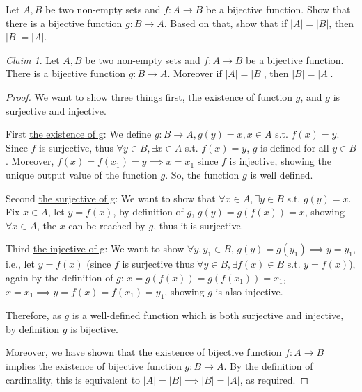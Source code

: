 \documentclass{homework}
\newcommand{\ra}{\rightarrow}
\newcommand{\?}{\stackrel{?}{=}}
\theoremstyle{remark}
\newtheorem*{claim}{Claim}
\begin{document}
\question Let $A,B$ be two non-empty sets and $f:A\rightarrow B$ be a bijective function. Show that there is a bijective function $g:B\rightarrow A$. Based on that, show that if $|A|=|B|$, then $|B|=|A|$. 
\begin{claim}
    Let $A,B$ be two non-empty sets and $f:A\rightarrow B$ be a bijective function. There is a bijective function $g:B\rightarrow A$. Moreover if $|A|=|B|$, then $|B|=|A|$. 
\end{claim}
\begin{proof}
    We want to show three things first, the existence of function $g$, and $g$ is surjective and injective.

    First \underline{the existence of g}: We define $g: B\ra A, g(y)=x, x\in A $ s.t. $f(x)=y$. Since $f$ is surjective, thus $\forall y\in B, \exists x\in A$ s.t. $f(x)=y$, $g$ is defined for all $y\in B$. Moreover, $f(x)=f(x_1)=y\implies x=x_1$ since $f$ is injective, showing the unique output value of the function $g$. So, the function $g$ is well defined.

    Second \underline{the surjective of g}: We want to show that $\forall x\in A, \exists y\in B$ s.t. $g(y)=x$. Fix $x\in A$, let $y=f(x)$, by definition of $g$, $g(y)=g(f(x))=x$, showing $\forall x\in A$, the $x$ can be reached by $g$, thus it is surjective.

    Third \underline{the injective of g}: We want to show $\forall y,y_1\in B$, $g(y)=g(y_1)\implies y=y_1$, i.e., let $y=f(x)$ (since $f$ is surjective thus $\forall y\in B, \exists f(x)\in B$ s.t. $y=f(x)$), again by the definition of $g$: $x=g(f(x))=g(f(x_1))=x_1$, $x=x_1\implies y=f(x)=f(x_1)=y_1$, showing $g$ is also injective.

    Therefore, as $g$ is a well-defined function which is both surjective and injective, by definition $g$ is bijective. 

    Moreover, we have shown that the existence of bijective function $f:A\ra B$ implies the existence of bijective function $g: B\ra A$. By the definition of cardinality, this is equivalent to $|A|=|B|\implies|B|=|A|$, as required. 
\end{proof}
\end{document}
